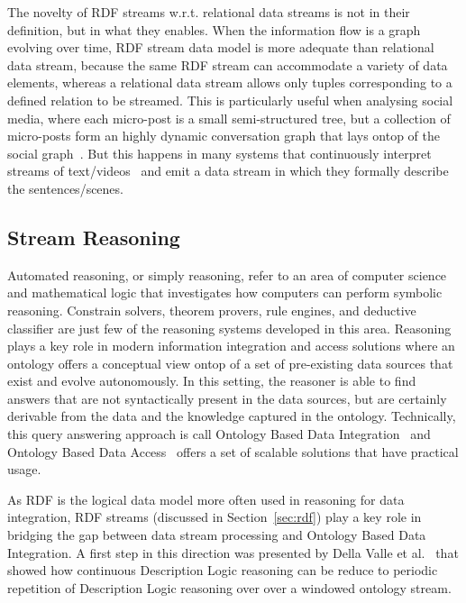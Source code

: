 The novelty of RDF streams w.r.t. relational data streams is not in their definition, but in what they enables. When the information flow is a graph evolving over time, RDF stream data model is more adequate than relational data stream, because the same RDF stream can accommodate a variety of data elements, whereas a relational data stream allows only tuples corresponding to a defined relation to be streamed. This is particularly useful when analysing social media, where each micro-post is a small semi-structured tree, but a collection of micro-posts form an highly dynamic conversation graph that lays ontop of the social graph~\cite{DBLP:conf/semweb/BalduiniVDTPC13}. But this happens in many systems that continuously interpret streams of text/videos~\cite{DBLP:journals/semweb/GangemiPRNDM17} and emit a data stream in which they formally describe the sentences/scenes. 

\subsection{Stream Reasoning}\label{sec:sr} %

Automated reasoning, or simply reasoning, refer to an area of computer science and mathematical logic that investigates how computers can perform symbolic reasoning. Constrain solvers, theorem provers, rule engines, and deductive classifier are just few of the reasoning systems developed in this area. Reasoning plays a key role in modern  information integration and access solutions where an ontology offers a conceptual view ontop of a set of pre-existing data sources that exist and evolve autonomously. In this setting, the reasoner is able to find answers that are not syntactically present in the data sources, but are certainly derivable from the data and the knowledge captured in the ontology. Technically, this query answering approach is call Ontology Based Data Integration~\cite{DBLP:conf/pods/Lenzerini02} and Ontology Based Data Access~\cite{DBLP:journals/jods/PoggiLCGLR08} offers a set of scalable solutions that have practical usage. 

As RDF is the logical data model more often used in reasoning for data integration, RDF streams (discussed in Section~\ref{sec:rdf}) play a key role in bridging the gap between data stream processing and Ontology Based Data Integration. A first step in this direction was presented by Della Valle et al.~\cite{DBLP:conf/fis/ValleCBBC08} that showed how continuous Description Logic reasoning can be reduce to periodic repetition of Description Logic reasoning over over a windowed ontology stream. 

